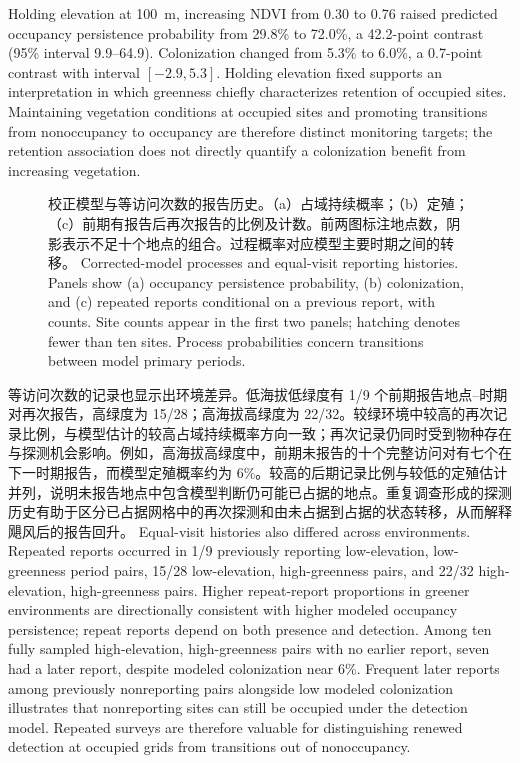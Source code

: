 \else
Holding elevation at 100~m, increasing NDVI from 0.30 to 0.76 raised predicted occupancy persistence probability from 29.8\% to 72.0\%, a 42.2-point contrast (95\% interval 9.9--64.9). Colonization changed from 5.3\% to 6.0\%, a 0.7-point contrast with interval $[-2.9,5.3]$. Holding elevation fixed supports an interpretation in which greenness chiefly characterizes retention of occupied sites. Maintaining vegetation conditions at occupied sites and promoting transitions from nonoccupancy to occupancy are therefore distinct monitoring targets; the retention association does not directly quantify a colonization benefit from increasing vegetation.
\fi
\begin{figure}[htbp]\centering
{}
\caption{\ifzh
校正模型与等访问次数的报告历史。（a）占域持续概率；（b）定殖；（c）前期有报告后再次报告的比例及计数。前两图标注地点数，阴影表示不足十个地点的组合。过程概率对应模型主要时期之间的转移。
\else
Corrected-model processes and equal-visit reporting histories. Panels show (a) occupancy persistence probability, (b) colonization, and (c) repeated reports conditional on a previous report, with counts. Site counts appear in the first two panels; hatching denotes fewer than ten sites. Process probabilities concern transitions between model primary periods.
\fi}\label{fig:envpersistence}
\end{figure}
\ifzh
等访问次数的记录也显示出环境差异。低海拔低绿度有 1/9 个前期报告地点--时期对再次报告，高绿度为 15/28；高海拔高绿度为 22/32。较绿环境中较高的再次记录比例，与模型估计的较高占域持续概率方向一致；再次记录仍同时受到物种存在与探测机会影响。例如，高海拔高绿度中，前期未报告的十个完整访问对有七个在下一时期报告，而模型定殖概率约为 6\%。较高的后期记录比例与较低的定殖估计并列，说明未报告地点中包含模型判断仍可能已占据的地点。重复调查形成的探测历史有助于区分已占据网格中的再次探测和由未占据到占据的状态转移，从而解释飓风后的报告回升。
\else
Equal-visit histories also differed across environments. Repeated reports occurred in 1/9 previously reporting low-elevation, low-greenness period pairs, 15/28 low-elevation, high-greenness pairs, and 22/32 high-elevation, high-greenness pairs. Higher repeat-report proportions in greener environments are directionally consistent with higher modeled occupancy persistence; repeat reports depend on both presence and detection. Among ten fully sampled high-elevation, high-greenness pairs with no earlier report, seven had a later report, despite modeled colonization near 6\%. Frequent later reports among previously nonreporting pairs alongside low modeled colonization illustrates that nonreporting sites can still be occupied under the detection model. Repeated surveys are therefore valuable for distinguishing renewed detection at occupied grids from transitions out of nonoccupancy.
\fi
\FloatBarrier
